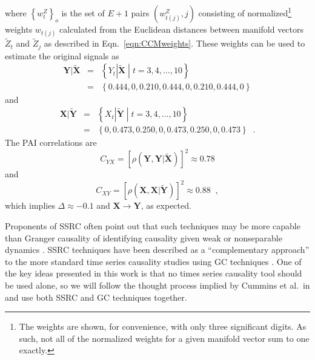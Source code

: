 where $\left\{w_{t}^Z\right\}_o$ is the set of $E+1$ pairs $\left(w_{t(j)}^Z,j\right)$ consisting of normalized\footnote{The weights are shown, for convenience, with only three significant digits. As such, not all of the normalized weights for a given manifold vector sum to one exactly.} weights $w_{t(j)}$ calculated from the Euclidean distances between manifold vectors $\tilde{Z}_t$ and $\tilde{Z}_j$ as described in Eqn.\ \ref{eqn:CCMweights}.  These weights can be used to estimate the original signals as
\begin{eqnarray}
\mathbf{Y}|\tilde{\mathbf{X}} &=& \left\{Y_t|\tilde{\mathbf{X}}\;|\;t=3,4,\ldots,10\right\}\\ 
&=& \left\{ 0.444,0,0.210,0.444,0,0.210,0.444,0\right\} 
\end{eqnarray}
and
\begin{eqnarray}
\mathbf{X}|\tilde{\mathbf{Y}} &=& \left\{X_t|\tilde{\mathbf{Y}}\;|\;t=3,4,\ldots,10\right\}\\ 
&=& \left\{ 0,0.473,0.250,0,0.473,0.250,0,0.473\right\}\;\;. 
\end{eqnarray}
The PAI correlations are
\begin{equation}
C_{YX} = \left[\rho\left(\mathbf{Y},\mathbf{Y}|\tilde{\mathbf{X}}\right)\right]^2 \approx 0.78
\end{equation}
and
\begin{equation}
C_{XY} = \left[\rho\left(\mathbf{X},\mathbf{X}|\tilde{\mathbf{Y}}\right)\right]^2 \approx 0.88\;\;,
\end{equation}
which implies $\Delta \approx -0.1$ and $\mathbf{X}\rightarrow\mathbf{Y}$, as expected.

Proponents of SSRC often point out that such techniques may be more capable than Granger causality of identifying causality given weak or nonseparable dynamics \cite{Sugihara2012,Ma2014,Cummins2015}.  SSRC techniques have been described as a ``complementary approach'' to the more standard time series causality studies using GC techniques \cite{Cummins2015}.  One of the key ideas presented in this work is that no times series causality tool should be used alone, so we will follow the thought process implied by Cummins et al.\ in \cite{Cummins2015} and use both SSRC and GC techniques together.


